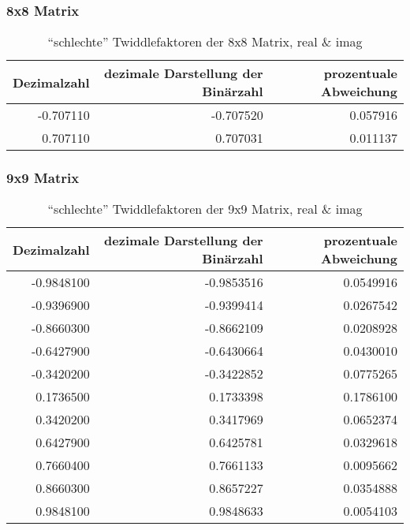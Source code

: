 	\begin{frame}\frametitle{8x8 Matrix}
		\begin{table}[ht]\caption{``schlechte'' Twiddlefaktoren der 8x8 Matrix, real \& imag}
		 \begin{tabular}{rrr}
		  \toprule
		  Dezimalzahl & dezimale Darstellung der Binärzahl & prozentuale Abweichung\\
		  \midrule
		  -0.707110   & -0.707520  & 0.057916\\
		   0.707110   &  0.707031  & 0.011137\\
		   \bottomrule
		 \end{tabular}\label{8x8Matrix}
		\end{table}

			
	\end{frame}
	\begin{frame}[t]\frametitle{9x9 Matrix}
	
		\begin{table}[ht]\caption{``schlechte'' Twiddlefaktoren der 9x9 Matrix, real \& imag}
		 \begin{tabular}{rrr}
		 \toprule
		  Dezimalzahl & dezimale Darstellung der Binärzahl & prozentuale Abweichung\\
		  \midrule
		  -0.9848100  & -0.9853516  & 0.0549916\\
		  -0.9396900  & -0.9399414  & 0.0267542\\
		  -0.8660300  & -0.8662109  & 0.0208928\\
		  -0.6427900  & -0.6430664  & 0.0430010\\
		  -0.3420200  & -0.3422852  & 0.0775265\\
		   0.1736500  &  0.1733398  & 0.1786100\\
		   0.3420200  &  0.3417969  & 0.0652374\\
		   0.6427900  &  0.6425781  & 0.0329618\\
		   0.7660400  &  0.7661133  & 0.0095662\\
		   0.8660300  &  0.8657227  & 0.0354888\\
		   0.9848100  &  0.9848633  & 0.0054103\\\bottomrule
		 \end{tabular}\label{9x9Matrix}
		\end{table}
		
	\end{frame}

